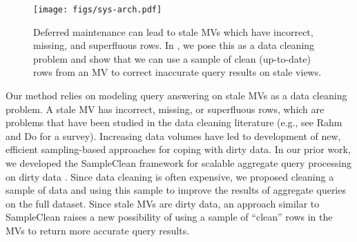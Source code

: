 
\begin{figure}[t] \vspace{-2em}
\centering
 \texttt{[image: figs/sys-arch.pdf]} \vspace{-.25em}
 \caption{Deferred maintenance can lead to stale MVs which have incorrect, missing, and superfluous rows. In \svc, we pose this as a data cleaning problem and show that we can use a sample of clean (up-to-date) rows from an MV to correct inaccurate query results on stale views.\label{sys-arch}}\vspace{-1.75em}
\end{figure}

Our method relies on modeling query answering on stale MVs as a data cleaning problem.
A stale MV has incorrect, missing, or superfluous rows, which are problems that have been studied in the data cleaning literature (e.g., see Rahm and Do for a survey\cite{rahm2000data}).
Increasing data volumes have led to development of new, efficient sampling-based approaches for coping with dirty data.   
In our prior work, we developed the SampleClean framework for scalable aggregate query processing on dirty data \cite{wang1999sample}.
Since data cleaning is often expensive, we proposed cleaning a sample of data and using this sample to improve the results of aggregate queries on the full dataset.
Since stale MVs are dirty data, an approach similar to SampleClean raises a new possibility of using a sample of ``clean'' rows in the MVs to return more accurate query results.

